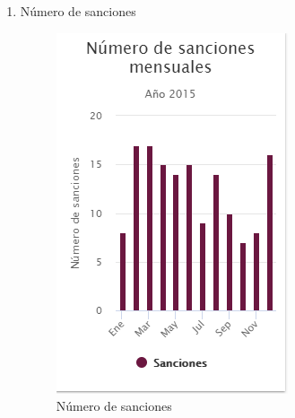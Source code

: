 \begin{itemize}
\begin{enumerate}
	\item Número de sanciones 
	\begin{figure}[hbtp]
	\includegraphics[scale=0.5]{images/InterfazMovil/IUGS15_sancionesMes.PNG}
	\caption{Número de sanciones}
	\end{figure}
	
	\end{enumerate}
	
\end{itemize}
